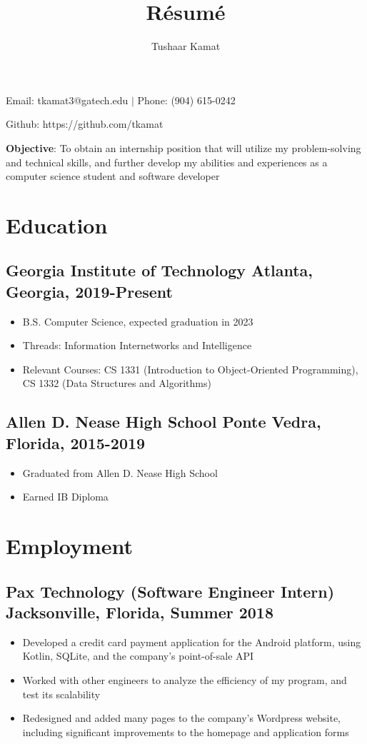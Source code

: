 \documentclass[12pt, noindent]{article}
\author{Tushaar Kamat}
\title{R\'esum\'e}
\makeatletter
\renewcommand{\maketitle}{
  \begin{center}
  \begin{Huge}
    \theauthor
  \end{Huge}

  Email: tkamat3@gatech.edu $\vert$ Phone: (904) 615-0242

  Github: https://github.com/tkamat
  \end{center}
}
\makeatother
\begin{document}
\maketitle

\noindent \textbf{Objective}: To obtain an internship position that will utilize
my problem-solving and technical skills, and further develop my abilities and
experiences as a computer science student and software developer

\vspace{1em}
\section{Education} 
\subsection{Georgia Institute of Technology \hfill \normalsize
\normalfont Atlanta, Georgia, 2019-Present}
\begin{itemize}
\itemsep-.25em
\item B.S. Computer Science, expected graduation in 2023
\item Threads: Information Internetworks and Intelligence 
\item Relevant Courses: CS 1331 (Introduction to Object-Oriented Programming),
  CS 1332 (Data Structures and Algorithms)
\end{itemize}
\subsection{Allen D. Nease High School \hfill \normalsize \normalfont Ponte
  Vedra, Florida, 2015-2019}
\begin{itemize}
\itemsep-.25em 
\item Graduated from Allen D. Nease High School
\item Earned IB Diploma
\end{itemize}

\section{Employment}
\subsection{Pax Technology (Software Engineer Intern) \hfill \normalsize \normalfont Jacksonville, Florida,
  Summer 2018}
\begin{itemize}
\itemsep-.25em
\item Developed a credit card payment application for the Android platform,
  using Kotlin, SQLite, and the company's point-of-sale API
\item Worked with other engineers to analyze the efficiency of my program, and
  test its scalability 
\item Redesigned and added many pages to the company's Wordpress website,
  including significant improvements to the homepage and application forms
\end{itemize}
\end{document}
